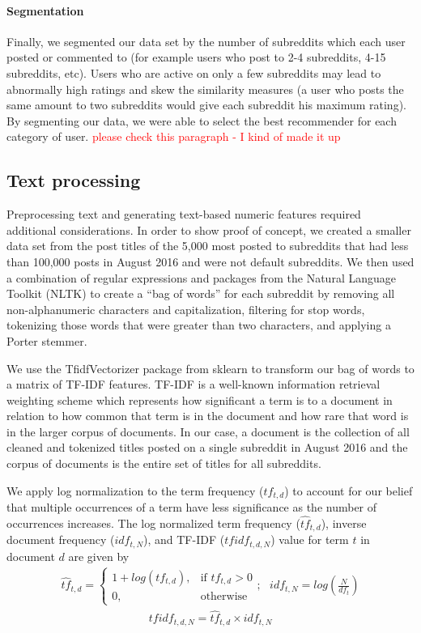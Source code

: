 \documentclass{article}
\begin{document}
\paragraph{Segmentation} Finally, we segmented our data set by the number of subreddits which each user posted or commented to (for example users who post to 2-4 subreddits, 4-15 subreddits, etc).  Users who are active on only a few subreddits may lead to abnormally high ratings and skew the similarity measures (a user who posts the same amount to two subreddits would give each subreddit his maximum rating).  By segmenting our data, we were able to select the best recommender for each category of user. \textcolor{red}{please check this paragraph - I kind of made it up}

\subsection{Text processing}

Preprocessing text and generating text-based numeric features required additional considerations.  In order to show proof of concept, we created a smaller data set from the post titles of the 5,000 most posted to subreddits that had less than 100,000 posts in August 2016 and were not default subreddits.   We then used a combination of regular expressions and packages from the Natural Language Toolkit (NLTK) to create a “bag of words” for each subreddit by removing all non-alphanumeric characters and capitalization, filtering for stop words, tokenizing those words that were greater than two characters, and applying a Porter stemmer. 

We use the TfidfVectorizer package from sklearn to transform our bag of words to a matrix of TF-IDF features.   TF-IDF is a well-known information retrieval weighting scheme which represents how significant a term is to a document in relation to how common that term is in the document and how rare that word is in the larger corpus of documents.  In our case, a document is the collection of all cleaned and tokenized titles posted on a single subreddit in August 2016 and the corpus of documents is the entire set of titles for all subreddits.  

We apply log normalization to the term frequency ($tf_{t,d}$) to account for our belief that multiple occurrences of a term have less significance as the number of occurrences increases.  The log normalized term frequency (${\hat{tf}_{t,d}}$), inverse document frequency ($idf_{t,N}$), and TF-IDF ($tfidf_{t,d,N}$) value for term $t$ in document $d$ are given by \begin{align*}
  {\hat{tf}_{t,d}} = \begin{cases}
                  1 + log(tf_{t,d}), & \text{if $tf_{t,d}$} > 0\\
                  0, & \text{otherwise}
              \end{cases} ; \text{      }    
    idf_{t,N} = log(\frac{N}{df_t}) 
\end{align*}
\begin{align*}
tfidf_{t,d,N} = {\hat{tf}_{t,d}} \times idf_{t,N}
\end{align*}
\end{document}
